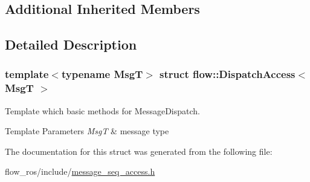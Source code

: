 \subsection*{Additional Inherited Members}


\subsection{Detailed Description}
\subsubsection*{template$<$typename MsgT$>$\newline
struct flow\+::\+Dispatch\+Access$<$ Msg\+T $>$}

Template which basic methods for Message\+Dispatch. 


\begin{DoxyTemplParams}{Template Parameters}
{\em MsgT} & message type \\
\hline
\end{DoxyTemplParams}


The documentation for this struct was generated from the following file\+:\begin{DoxyCompactItemize}
\item 
flow\+\_\+ros/include/\hyperlink{message__seq__access_8h}{message\+\_\+seq\+\_\+access.\+h}\end{DoxyCompactItemize}
